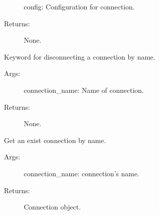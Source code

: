 \documentclass[letterpaper,10pt,english]{sphinxmanual}
\begin{document}
\begin{fulllineitems}
\begin{fulllineitems}
\begin{description}
\sphinxAtStartPar
config: Configuration for connection.

\item[{Returns:}] \leavevmode
\sphinxAtStartPar
None.

\end{description}

\end{fulllineitems}


\begin{fulllineitems}
\label{\detokenize{QConnectBase:QConnectBase.connection_manager.ConnectionManager.disconnect}}
\sphinxAtStartPar
Keyword for disconnecting a connection by name.
\begin{description}
\item[{Args:}] \leavevmode
\sphinxAtStartPar
connection\_name: Name of connection.

\item[{Returns:}] \leavevmode
\sphinxAtStartPar
None.

\end{description}

\end{fulllineitems}


\begin{fulllineitems}
\label{\detokenize{QConnectBase:QConnectBase.connection_manager.ConnectionManager.get_connection_by_name}}
\sphinxAtStartPar
Get an exist connection by name.
\begin{description}
\item[{Args:}] \leavevmode
\sphinxAtStartPar
connection\_name: connection’s name.

\item[{Returns:}] \leavevmode
\sphinxAtStartPar
Connection object.

\end{description}


\end{fulllineitems}
\end{fulllineitems}
\end{document}
